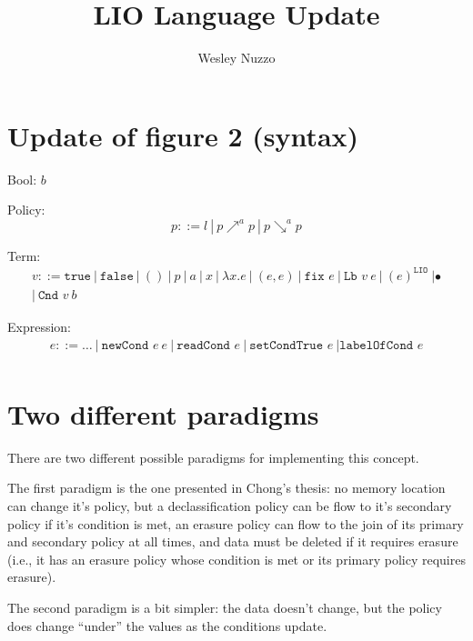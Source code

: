\documentclass[11pt, oneside]{article}   	%
\title{LIO Language Update}
\author{Wesley Nuzzo}
\begin{document}
\maketitle

\section{Update of figure 2 (syntax)} 
\noindent 

Bool: $b$

Policy:
\begin{equation*} p ::=  l\ |\ p\nearrow^a p\ |\ p\searrow^a p  \end{equation*}

Term:
\begin{equation*}
\begin{split}
v::= \texttt{true}\ |\ \texttt{false}\ |\ ()\ |\ p\ |\ a\ |\ x\ |\  \lambda x.e\ |\ (e,e)\ 
|\ \texttt{fix } e\ |\ \texttt{Lb } v\ e\ |\ (e)^\texttt{LIO}\ | \bullet \\
|\ \texttt{Cnd } v\ b
\end{split}
\end{equation*}

Expression:
\begin{equation*}
\begin{split}
e::= \dots\ |\ \texttt{newCond } e\ e\ |\ \texttt{readCond } e\ |\ \texttt{setCondTrue } e\ | \texttt{labelOfCond } e \\
\end{split}
\end{equation*}

\section{Two different paradigms}
There are two different possible paradigms for implementing this concept.

The first paradigm is the one presented in Chong's thesis: no memory location can change it's policy, but a declassification policy can be flow to it's secondary policy if it's condition is met, an erasure policy can flow to the join of its primary and secondary policy at all times, and data must be deleted if it requires erasure (i.e., it has an erasure policy whose condition is met or its primary policy requires erasure).

The second paradigm is a bit simpler: the data doesn't change, but the policy does change ``under'' the values as the conditions update.
\end{document}

